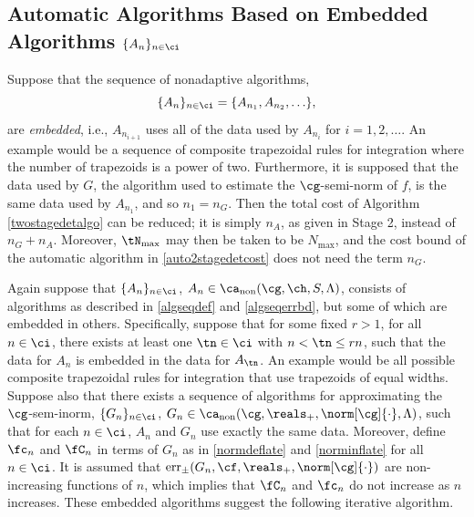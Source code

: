 \documentclass[]{elsarticle}
\DeclareMathOperator{\fix}{non}
\DeclareMathOperator{\err}{err}
\theoremstyle{definition}
\theoremstyle{remark}
\begin{document}
\subsection{Automatic Algorithms Based on Embedded Algorithms $\{A_n\}_{n \in \ci}$}

Suppose that the sequence of nonadaptive algorithms, 
\[
\{A_n\}_{n \in \ci} = \{A_{n_1}, A_{n_2}, \ldots \}, 
\]
are \emph{embedded}, i.e., $A_{n_{i+1}}$ uses all of the data used by $A_{n_{i}}$ for $i=1, 2, \ldots$.  An example would be a sequence of composite trapezoidal rules for integration where the number of trapezoids is a power of two. Furthermore, it is supposed that the data used by $G$, the algorithm used to estimate the $\cg$-semi-norm of $f$, is the same data used by $A_{n_1}$, and so $n_1=n_G$.  Then the total cost of Algorithm \ref{twostagedetalgo} can be reduced; it is simply $n_A$, as given in Stage 2, instead of $n_G+n_A$.  Moreover, $\tN_{\max}$ may then be taken to be $N_{\max}$, and the cost bound of the automatic algorithm in \eqref{auto2stagedetcost} does not need the term $n_G$.

Again suppose that $\{A_n\}_{n \in \ci}$, $A_n  \in \ca_{\fix}(\cg,\ch,S,\Lambda)$, consists of algorithms as described in  \eqref{algseqdef} and \eqref{algseqerrbd}, but some of which are embedded in others.  Specifically, suppose that for some fixed $r > 1$, for all $n \in \ci$, there exists at least one $\tn \in \ci$ with $n < \tn \le rn$, such that the data for $A_n$ is embedded in the data for $A_{\tn}$.  An example would be all possible composite trapezoidal rules for integration that use trapezoids of equal widths. Suppose also that there exists a sequence of algorithms for approximating the $\cg$-sem-inorm, $\{G_n\}_{n \in \ci}$, $G_n  \in \ca_{\fix}(\cg,\reals_+,\norm[\cg]{\cdot},\Lambda)$, such that for each $n \in \ci$, $A_n$ and $G_n$ use exactly the same data. Moreover, define $\fc_n$ and $\fC_n$ in terms of $G_n$ as in \eqref{normdeflate} and \eqref{norminflate} for all $n \in \ci$.
It is assumed that $\err_{\pm}(G_n,\cf,\reals_+,\norm[\cg]{\cdot})$ are non-increasing functions of $n$, which implies that $\fC_{n}$ and $\fc_n$ do not increase as $n$ increases. These embedded algorithms suggest the following iterative algorithm.
\end{document}
